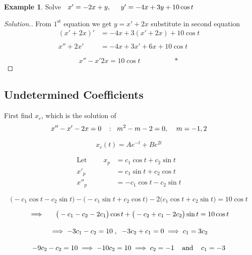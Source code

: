\documentclass[11pt,a4paper]{article}
\theoremstyle{definition}
\newtheorem{exa}[thm]{Example}
\newenvironment{solution}
  {\renewcommand{\qedsymbol}{}\begin{proof}[\textit{Solution}.]}
  {\end{proof}}
\begin{document}
\begin{exa}


Solve $\hspace{0.2cm} x' = -2x + y,\hspace{0.5cm} y' = -4x + 3y + 10\cos t$
\end{exa}


\begin{solution}


From $1^{\text{st}}$ equation we get $y = x' + 2x$ substitute in second equation
\begin{align*}
(x' + 2x)' & = -4x + 3(x' + 2x) + 10\cos t\\\\
x'' + 2x' & = -4x + 3x' + 6x + 10\cos t
\end{align*}

$$x'' - x' 2x = 10\cos t\hspace{2cm} *$$
\end{solution}


{\color[wave]{485}\subsection{Undetermined Coefficients}}
First find $x_c$, which  is the solution of  $$x'' -x' -2x = 0\hspace{0.3cm}:\hspace{0.2cm} m^2 - m - 2 = 0,\hspace{0.4cm} m = -1,2$$

$$x_c(t) = Ae^{-t} + Be^{2t}$$

\begin{align*}
\text{Let}\hspace{1cm} x_p & = c_1\cos t + c_2 \sin t \\
x'_p & = c_1 \sin t + c_2 \cos t\\
x''_p & = -c_1 \cos t - c_2 \sin t
\end{align*}

$$\big( - c_1 \cos t - c_2 \sin t \big) - \big( -c_1 \sin t + c_2 \cos t\big) - 2\big( c_1 \cos t + c_2 \sin t \big) = 10 \cos t$$

$$\implies \hspace{0.5cm} \big( -c_1 -c_2 -2c_1 \big) \cos t + \big( -c_2 + c_1 -2c_2 \big) \sin t = 10 \cos t$$

$$\implies -3c_1 - c_2 = 10\hspace{0.1cm}, \hspace{0.2cm} -3c_2 + c_1 = 0 \implies c_1 = 3c_2$$

$$-9c_2 - c_2 = 10 \implies -10c_2 = 10 \implies c_2 = -1\hspace{0.4cm}\text{and}\hspace{0.4cm} c_1 = -3$$
\end{document}
